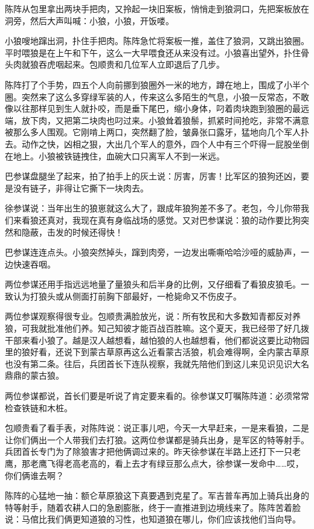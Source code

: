 \par 陈阵从包里拿出两块手把肉，又拎起一块旧案板，悄悄走到狼洞口，先把案板放在洞旁，然后大声叫喊：小狼，小狼，开饭喽。
\par 小狼嗖地蹿出洞，扑住手把肉。陈阵急忙将案板一推，盖住了狼洞，又跳出狼圈。平时喂狼是在上午和下午，这么一大早喂食还从来没有过。小狼喜出望外，扑住骨头肉就狼吞虎咽起来。包顺贵和几位军人立即退后了几步。
\par 陈阵打了个手势，四五个人向前挪到狼圈外一米的地方，蹲在地上，围成了小半个圈。突然来了这么多穿绿军装的人，传来这么多陌生的气息，小狼一反常态，不敢像以往那样见到生人就扑咬，而是垂下尾巴，缩小身体，叼着肉块跑到狼圈的最远端，放下肉，又把第二块肉也叼过来。小狼耸着狼鬃，抓紧时间抢吃，非常不满意被那么多人围观。它刚啃上两口，突然翻了脸，皱鼻张口露牙，猛地向几个军人扑去。动作之快，凶相之狠，大出几个军人的意外，四个人中有三个吓得一屁股坐倒在地上。小狼被铁链拽住，血碗大口只离军人不到一米远。
\par 巴参谋盘腿坐了起来，拍了拍手上的灰土说：厉害，厉害！比军区的狼狗还凶，要是没有链子，非得让它撕下一块肉去。
\par 徐参谋说：当年出生的狼崽就这么大了，跟成年狼狗差不多了。老包，今儿你带我们来看狼还真对，我现在真有身临战场的感觉。又对巴参谋说：狼的动作要比狗突然和隐蔽，击发的时候还得快！
\par 巴参谋连连点头。小狼突然掉头，蹿到肉旁，一边发出嘶嘶哈哈沙哑的威胁声，一边快速吞咽。
\par 两位参谋还用手指远远地量了量狼头和后半身的比例，又仔细看了看狼皮狼毛。一致认为打狼头或从侧面打前胸下部最好，一枪毙命又不伤皮子。
\par 两位参谋观察得很专业。包顺贵满脸放光，说：所有牧民和大多数知青都反对养狼，可我就批准他们养。知己知彼才能百战百胜嘛。这个夏天，我已经带了好几拨干部来看小狼了。越是汉人越想看，越怕狼的人也越想看，他们都说这要比动物园里的狼好看，还说下到蒙古草原再这么近看蒙古活狼，机会难得啊，全内蒙古草原也没有第二条。往后，兵团首长下连队视察，我就先陪他们到这儿来见识见识大名鼎鼎的蒙古狼。
\par 两位参谋都说，首长们要是听说了肯定要来看的。徐参谋又叮嘱陈阵道：必须常常检查铁链和木桩。
\par 包顺贵看了看手表，对陈阵说：说正事儿吧，今天一大早赶来，一是来看狼，二是让你们俩出一个人带我们去打狼。这两位参谋都是骑兵出身，是军区的特等射手。兵团首长专门为了除狼害才把他俩调过来的。昨天徐参谋在半路上还打下一只老鹰，那老鹰飞得老高老高的，看上去才有绿豆那么点大，徐参谋一发命中……哎，你们俩谁去啊？
\par 陈阵的心猛地一抽：额仑草原狼这下真要遇到克星了。军吉普车再加上骑兵出身的特等射手，随着农耕人口的急剧膨胀，终于一直推进到边境线来了。陈阵苦着脸说：马倌比我们俩更知道狼的习性，也知道狼在哪儿，你们应该找他们当向导。
